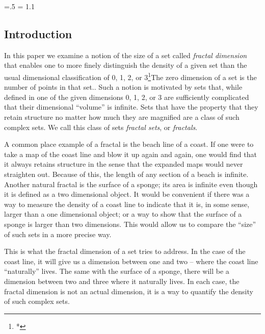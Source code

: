 


\def\dup{%
\setbox0=\vbox{\hbox{\kern2.5\wd0\copy0} \hbox{\kern2.5\wd0\copy0 \kern2.5\wd0\copy0}}}

\newcount \fcount


\def\fracaux{
\ifnum\fcount>0
\advance\fcount by-1
\dup
\fracaux \else \fi
}

\def\fractal#1{%
\setbox0=\hbox{\vrule height2pt width3pt \vrule height2pt width3pt \kern3pt}
\offinterlineskip
\fcount=#1
\fracaux
\vbox{\copy0}}



\parindent=0pt
\parskip=.5\baselineskip
\baselineskip = 1.1\baselineskip

\subsection{Introduction}
In this paper we examine a notion of the size of a set called 
{\it fractal dimension} that enables one to more
finely distinguish the density of a given set than the usual
dimensional classification of 0, 1, 2, or 
{\parindent=0pt
3\footnote{*}{The zero dimension of a set is the number of points in
that set.}}. Such a notion is 
motivated by sets that, while defined in one of the given
dimensions 0, 1, 2, or 3 are sufficiently
complicated that their dimensional ``volume'' is infinite. 
Sets that have
the property that they retain structure no matter how much they are
magnified are a class of such complex sets. We call this class of sets
{\it fractal sets}, or
{\it fractals}. 

A common place example of a fractal is the beach line of
a coast. If one were to take a map of the coast line and blow it up
again and again, one would find that it always retains structure in the
sense that the expanded maps would never straighten out.
Because of this, the length of any section of a beach is
infinite. Another natural fractal is the surface of a sponge; its area is
infinite even though it is defined as a two dimensional object. 
It would be convenient if there was a way to
measure the density of a coast line to
indicate that it is, in some sense, larger than a one dimensional
object; or a way to show that the surface of a sponge is larger than
two dimensions. This would allow us to compare the ``size'' of such sets
in a more precise way.

This is what the fractal dimension of a set tries to address. 
In the case of the coast line, it will give us a dimension between one and two
-- where the coast line ``naturally'' lives. The same with the surface of
a sponge,
there will be a dimension between two and three where it naturally lives. In
each case, the fractal dimension is not an actual dimension, 
it is a way to quantify the density of such complex sets.

